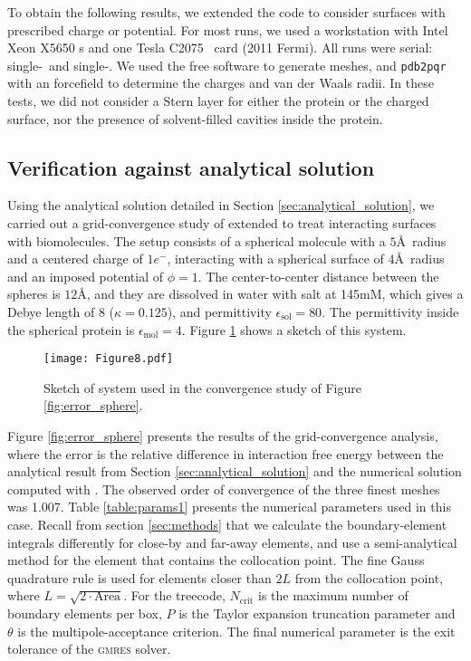 
To obtain the following results, we extended the \pygbe code to consider surfaces with prescribed charge or potential. For most runs, we used a workstation with Intel Xeon X5650 \cpu s  and one \nvidia Tesla C2075 \gpu\ card (2011 Fermi). All runs were serial: single-\cpu\ and single-\gpu. We used the free \msms software\cite{SannerOlsonSpehner1995} to generate meshes, and \texttt{pdb2pqr}\cite{Dolinsky04} with an \amber forcefield to determine the charges and van der Waals radii. In these tests, we did not consider a Stern layer for either the protein or the charged surface, nor the presence of solvent-filled cavities inside the protein.

\subsection{Verification against analytical solution} \label{sec:verification}

Using the analytical solution detailed in Section \ref{sec:analytical_solution}, we carried out a grid-convergence study of \pygbe extended to treat interacting surfaces with biomolecules. The setup consists of a spherical molecule with a $5$\AA~radius and a centered charge of $1e^-$, interacting with a spherical surface of $4$\AA~radius and an imposed potential of $\phi=1$. The center-to-center distance between the spheres is $12$\AA, and they are dissolved in water with salt at 145mM, which gives a Debye length of 8 ($\kappa = 0.125$), and permittivity $\epsilon_\text{sol} = 80$. The permittivity inside the spherical protein is $\epsilon_\text{mol} = 4$. Figure \ref{fig:twosphere_num} shows a sketch of this system.

\begin{figure}[h] %
   \centering
   \texttt{[image: Figure8.pdf]} 
   \caption{Sketch of system used in the convergence study of Figure \ref{fig:error_sphere}.}
   \label{fig:twosphere_num}
\end{figure}

Figure \ref{fig:error_sphere} presents the results of the grid-convergence analysis, where the error is the relative difference in interaction free energy between the analytical result from Section \ref{sec:analytical_solution} and the numerical solution computed with \pygbe. The observed order of convergence of the three finest meshes was 1.007. Table \ref{table:params1} presents the numerical parameters used in this case. Recall from section \ref{sec:methods} that we calculate the boundary-element integrals differently for close-by and far-away elements, and use a semi-analytical method for the element that contains the collocation point. The fine Gauss quadrature rule is used for elements closer than $2L$ from the collocation point, where $L=\sqrt{2\cdot \text{Area}}$. For the treecode,  $N_{\text{crit}}$ is the maximum number of boundary elements per box, $P$ is the Taylor expansion truncation parameter and $\theta$ is the multipole-acceptance criterion. The final numerical parameter is the exit tolerance of the \textsc{gmres} solver.

